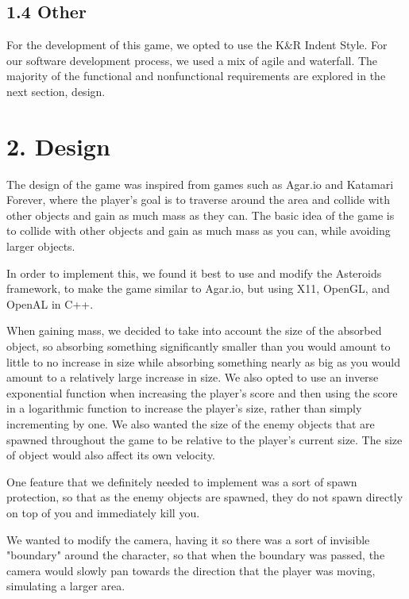\documentclass[12pt]{report}
\begin{document}
\subsection*{1.4 Other}
For the development of this game, we opted to use the K\&R Indent Style. For our software development process, we used a mix of agile and waterfall. The majority of the functional and nonfunctional requirements are explored in the next section, design.

\newpage
\section*{2. Design}

The design of the game was inspired from games such as Agar.io and Katamari Forever, where the player's goal is to traverse around the area and collide with other objects and gain as much mass as they can. The basic idea of the game is to collide with other objects and gain as much mass as you can, while avoiding larger objects. \bigskip

In order to implement this, we found it best to use and modify the Asteroids framework, to make the game similar to Agar.io, but using X11, OpenGL, and OpenAL in C++. \bigskip

When gaining mass, we decided to take into account the size of the absorbed object, so absorbing something significantly smaller than you would amount to little to no increase in size while absorbing something nearly as big as you would amount to a relatively large increase in size. We also opted to use an inverse exponential function when increasing the player's score and then using the score in a logarithmic function to increase the player's size, rather than simply incrementing by one. We also wanted the size of the enemy objects that are spawned throughout the game to be relative to the player's current size. The size of object would also affect its own velocity. \bigskip

One feature that we definitely needed to implement was a sort of spawn protection, so that as the enemy objects are spawned, they do not spawn directly on top of you and immediately kill you. \bigskip

We wanted to modify the camera, having it so there was a sort of invisible "boundary" around the character, so that when the boundary was passed, the camera would slowly pan towards the direction that the player was moving, simulating a larger area. \bigskip
\end{document}
